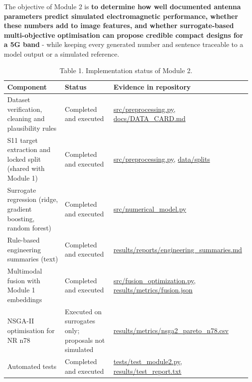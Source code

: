 \documentclass[11pt,a4paper]{article}
\begin{document}
The objective of Module 2 is \textbf{to determine how well documented antenna parameters predict simulated electromagnetic performance, whether these numbers add to image features, and whether surrogate-based multi-objective optimisation can propose credible compact designs for a 5G band} - while keeping every generated number and sentence traceable to a model output or a simulated reference.

\begin{table}[H]\centering\small
\caption*{Table 1. Implementation status of Module 2.}
\begin{tabularx}{\linewidth}{XXX}
\toprule
\textbf{Component} & \textbf{Status} & \textbf{Evidence in repository} \\
\midrule
Dataset verification, cleaning and plausibility rules & Completed and executed & \href{https://github.com/rathiabeth-sudo/902---Module-2/blob/main/src/preprocessing.py}{src/preprocessing.py}, \href{https://github.com/rathiabeth-sudo/902---Module-2/blob/main/docs/DATA_CARD.md}{docs/DATA\_CARD.md} \\
S11 target extraction and locked split (shared with Module 1) & Completed and executed & \href{https://github.com/rathiabeth-sudo/902---Module-2/blob/main/src/preprocessing.py}{src/preprocessing.py}, \href{https://github.com/rathiabeth-sudo/902---Module-2/tree/main/data/splits}{data/splits} \\
Surrogate regression (ridge, gradient boosting, random forest) & Completed and executed & \href{https://github.com/rathiabeth-sudo/902---Module-2/blob/main/src/numerical_model.py}{src/numerical\_model.py} \\
Rule-based engineering summaries (text) & Completed and executed & \href{https://github.com/rathiabeth-sudo/902---Module-2/blob/main/results/reports/engineering_summaries.md}{results/reports/engineering\_summaries.md} \\
Multimodal fusion with Module 1 embeddings & Completed and executed & \href{https://github.com/rathiabeth-sudo/902---Module-2/blob/main/src/fusion_optimization.py}{src/fusion\_optimization.py}, \href{https://github.com/rathiabeth-sudo/902---Module-2/blob/main/results/metrics/fusion.json}{results/metrics/fusion.json} \\
NSGA-II optimisation for NR n78 & Executed on surrogates only; proposals not simulated & \href{https://github.com/rathiabeth-sudo/902---Module-2/blob/main/results/metrics/nsga2_pareto_n78.csv}{results/metrics/nsga2\_pareto\_n78.csv} \\
Automated tests & Completed and executed & \href{https://github.com/rathiabeth-sudo/902---Module-2/blob/main/tests/test_module2.py}{tests/test\_module2.py}, \href{https://github.com/rathiabeth-sudo/902---Module-2/blob/main/results/test_report.txt}{results/test\_report.txt} \\

\end{tabularx}
\end{table}
\end{document}
